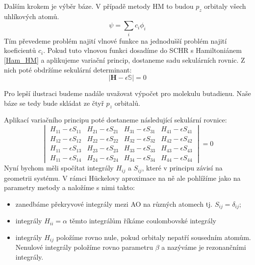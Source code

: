 Dalším krokem je výběr báze. V případě metody HM to budou $p_z$ orbitaly všech uhlíkových atomů.
\begin{equation}
\psi= \sum_i c_i \phi_i
\label{rov:HM_MO}
\end{equation}
Tím převedeme problém najití vlnové funkce na jednodušší problém najití koeficientů $c_i$. Pokud tuto vlnovou funkci dosadíme do SCHR s Hamiltoniánem \ref{Ham_HM} a aplikujeme variační princip, dostaneme sadu sekulárních rovnic. Z nich poté obdržíme sekulární determinant:
\begin{equation}
|\mathbf{H}-\epsilon \mathbb{S}|=0
\label{rov:HM_det}
\end{equation}

Pro lepší ilustraci budeme nadále uvažovat výpočet pro molekulu butadienu.
Naše báze se tedy bude skládat ze čtyř $p_z$ orbitalů.

Aplikací variačního principu poté dostaneme následující sekulární rovnice:
\begin{equation}
\begin{vmatrix}
H_{11}-\epsilon S_{11} & H_{21}-\epsilon S_{21} & H_{31}-\epsilon S_{31} & H_{41}-\epsilon S_{41}  \\
H_{12}-\epsilon S_{12} & H_{22}-\epsilon S_{22} & H_{32}-\epsilon S_{32} & H_{42}-\epsilon S_{42}  \\
H_{11}-\epsilon S_{13} & H_{23}-\epsilon S_{23} & H_{33}-\epsilon S_{33} & H_{43}-\epsilon S_{43}  \\
H_{11}-\epsilon S_{14} & H_{24}-\epsilon S_{24} & H_{34}-\epsilon S_{34} & H_{44}-\epsilon S_{44}
\end{vmatrix}
= 0
\end{equation}
Nyní bychom měli spočítat integrály $H_{ij}$ a $S_{ij}$, které v principu závisí na geometrii systému.
V rámci H\"{u}ckelovy aproximace na ně ale pohlížíme jako na parametry metody
a naložíme s nimi takto:
\begin{itemize}
\item zanedbáme překryvové integrály mezi AO na různých atomech tj. $S_{ij}=\delta_{ij}$;
\item integrály $H_{ii}=\alpha$ těmto integrálům říkáme coulombovské integrály
\item integrály $H_{ij}$ položíme rovno nule, pokud orbitaly nepatří sousedním atomům.
Nenulové integrály položíme rovno parametru $\beta$ a nazýváme je rezonančními integrály.
\end{itemize}


